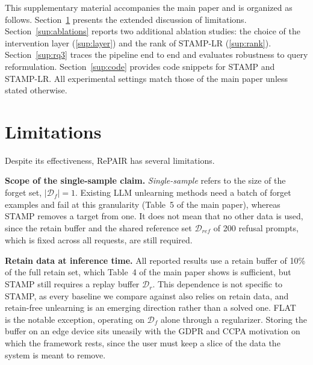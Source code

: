 
\noindent This supplementary material accompanies the main paper and is organized as follows. Section~\ref{sup:limitations} presents the extended discussion of limitations. Section~\ref{sup:ablations} reports two additional ablation studies: the choice of the intervention layer (\ref{sup:layer}) and the rank of STAMP-LR (\ref{sup:rank}). Section~\ref{sup:rq3} traces the pipeline end to end and evaluates robustness to query reformulation. Section~\ref{sup:code} provides code snippets for STAMP and STAMP-LR. All experimental settings match those of the main paper unless stated otherwise.

\section{Limitations}
\label{sup:limitations}
Despite its effectiveness, RePAIR has several limitations.

\noindent
\textbf{Scope of the single-sample claim.} \textit{Single-sample} refers to the size of the forget set, $|\mathcal{D}_f| = 1$. Existing LLM unlearning methods need a batch of forget examples and fail at this granularity (Table~5 of the main paper), whereas STAMP removes a target from one. It does not mean that no other data is used, since the retain buffer and the shared reference set $\mathcal{D}_{\textit{ref}}$ of 200 refusal prompts, which is fixed across all requests, are still required. %

\noindent
\textbf{Retain data at inference time.} All reported results use a retain buffer of 10\% of the full retain set, which Table~4 of the main paper shows is sufficient, but STAMP still requires a replay buffer $\mathcal{D}_r$. This dependence is not specific to STAMP, as every baseline we compare against also relies on retain data, and retain-free unlearning is an emerging direction rather than a solved one. FLAT~\cite{wang2024llm} is the notable exception, operating on $\mathcal{D}_f$ alone through a regularizer. Storing the buffer on an edge device sits uneasily with the GDPR and CCPA motivation on which the framework rests, since the user must keep a slice of the data the system is meant to remove. %

